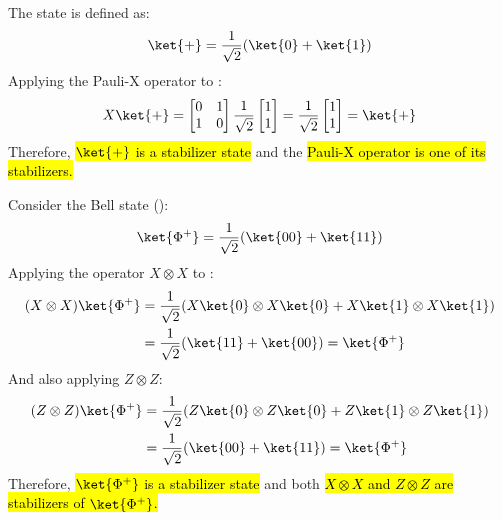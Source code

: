 \highspace
\begin{examplebox}[: \ket{+}]
    The state \ket{+} is defined as:
    \begin{equation*}
        \ket{+} = \frac{1}{\sqrt{2}}(\ket{0} + \ket{1})
    \end{equation*}
    Applying the Pauli-X operator to \ket{+}:
    \begin{equation*}
        X\ket{+} = \begin{bmatrix}
            0 & 1 \\
            1 & 0
        \end{bmatrix} \frac{1}{\sqrt{2}} \begin{bmatrix}
            1 \\
            1
        \end{bmatrix} = \frac{1}{\sqrt{2}} \begin{bmatrix}
            1 \\
            1
        \end{bmatrix} = \ket{+}
    \end{equation*}
    Therefore, \hl{$\ket{+}$ is a stabilizer state} and the \hl{Pauli-X operator is one of its stabilizers.}
\end{examplebox}

\highspace
\begin{examplebox}
    Consider the Bell state ():
    \begin{equation*}
        \ket{\Phi^+} = \frac{1}{\sqrt{2}}(\ket{00} + \ket{11})
    \end{equation*}
    Applying the operator $X \otimes X$ to \ket{\Phi^+}:
    \begin{align*}
        (X \otimes X)\ket{\Phi^+} &= \frac{1}{\sqrt{2}}(X\ket{0} \otimes X\ket{0} + X\ket{1} \otimes X\ket{1}) \\
        &=
        \frac{1}{\sqrt{2}}(\ket{11} + \ket{00}) = \ket{\Phi^+}
    \end{align*}
    And also applying $Z \otimes Z$:
    \begin{align*}
        (Z \otimes Z)\ket{\Phi^+} &= \frac{1}{\sqrt{2}}(Z\ket{0} \otimes Z\ket{0} + Z\ket{1} \otimes Z\ket{1}) \\
        &=
        \frac{1}{\sqrt{2}}(\ket{00} + \ket{11}) = \ket{\Phi^+}
    \end{align*}
    Therefore, \hl{$\ket{\Phi^+}$ is a stabilizer state} and both \hl{$X \otimes X$ and $Z \otimes Z$ are stabilizers of $\ket{\Phi^+}$.}
\end{examplebox}

